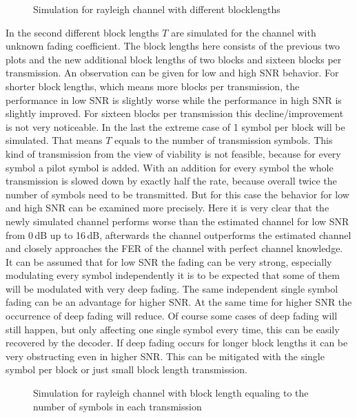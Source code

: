 \begin{figure}[!htb]
	\setlength{}
	\setlength\fheight{0.4\textheight}
	\centering
	
	\caption{Simulation for rayleigh channel with different blocklengths}
	\label{fig:rayfersec}
\end{figure}
In the second  different block lengths \textbf{$T$} are simulated for the channel with unknown fading coefficient. The block lengths here consists of the previous two plots and the new additional block lengths of two blocks and sixteen blocks per transmission.
An observation can be given for low and high \gls{SNR} behavior. For shorter block lengths, which means more blocks per transmission, the performance in low \gls{SNR} is slightly worse while the performance in high \gls{SNR} is slightly improved. For sixteen blocks per transmission this decline/improvement is not very noticeable.
\newline
In the last  the extreme case of 1 symbol per block will be simulated. That means \textbf{$T$} equals to the number of transmission symbols. This kind of transmission from the view of viability is not feasible, because for every symbol a pilot symbol is added. With an addition for every symbol the whole transmission is slowed down by exactly half the rate, because overall twice the number of symbols need to be transmitted. But for this case the behavior for low and high SNR can be examined more precisely. 
\newline
Here it is very clear that the newly simulated channel performs worse than the estimated channel for low SNR from 0\,dB up to 16\,dB, afterwards the channel outperforms the estimated channel and closely approaches the \gls{FER} of the channel with perfect channel knowledge. It can be assumed that for low SNR the fading can be very strong, especially modulating every symbol independently it is to be expected that some of them will be modulated with very deep fading. The same independent single symbol fading can be an advantage for higher SNR. At the same time for higher SNR the occurrence of deep fading will reduce. Of course some cases of deep fading will still happen, but only affecting one single symbol every time, this can be easily recovered by the decoder. If deep fading occurs for longer block lengths it can be very obstructing even in higher SNR. This can be mitigated with the single symbol per block or just small block length transmission.
\begin{figure}[!htb]
	\setlength{}
	\setlength\fheight{0.4\textheight}
	\centering
		
	\caption{Simulation for rayleigh channel with block length equaling to the number of symbols in each transmission}
	\label{fig:rayferthird}
\end{figure}



\clearpage
